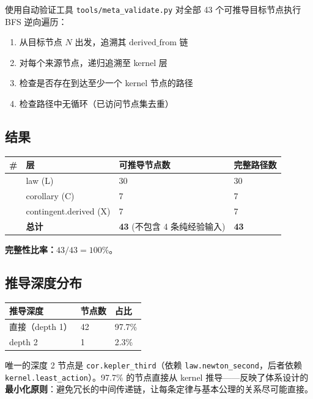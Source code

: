 使用自动验证工具 \texttt{tools/meta\_validate.py} 对全部 43 个可推导目标节点执行 BFS 逆向遍历：

\begin{enumerate}
  \item 从目标节点 $N$ 出发，追溯其 $\text{derived\_from}$ 链
  \item 对每个来源节点，递归追溯至 kernel 层
  \item 检查是否存在到达至少一个 kernel 节点的路径
  \item 检查路径中无循环（已访问节点集去重）
\end{enumerate}

\subsection{结果}

\begin{center}
\begin{tabular}{p{0.4cm}p{4cm}p{3cm}p{3cm}}
\toprule
\textbf{\#} & \textbf{层} & \textbf{可推导节点数} & \textbf{完整路径数} \\
\midrule
 & law (L) & 30 & 30 \\
 & corollary (C) & 7 & 7 \\
 & contingent.derived (X) & 7 & 7 \\
\midrule
 & \textbf{总计} & \textbf{43} (不包含 4 条纯经验输入) & \textbf{43} \\
\bottomrule
\end{tabular}
\end{center}

\textbf{完整性比率：$43/43 = 100\%$}。

\subsection{推导深度分布}

\begin{center}
\begin{tabular}{p{3cm}p{3cm}p{4cm}}
\toprule
\textbf{推导深度} & \textbf{节点数} & \textbf{占比} \\
\midrule
直接（depth 1） & 42 & 97.7\% \\
depth 2 & 1 & 2.3\% \\
\bottomrule
\end{tabular}
\end{center}

唯一的深度 2 节点是 \texttt{cor.kepler\_third}（依赖 \texttt{law.newton\_second}，后者依赖 \texttt{kernel.least\_action}）。97.7\% 的节点直接从 kernel 推导——反映了体系设计的\textbf{最小化原则}：避免冗长的中间传递链，让每条定律与基本公理的关系尽可能直接。

